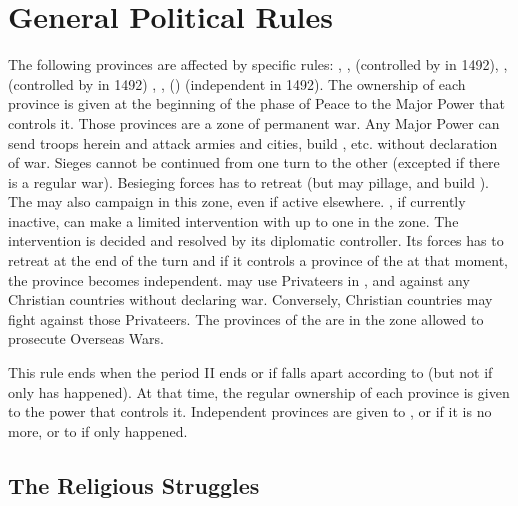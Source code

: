 
\section{General Political Rules}

\label{chSpecific:Balkans}

\aparag The following provinces are affected by specific rules:
, ,  (controlled by \TUR
in 1492), ,  (controlled by \VEN in 1492)
, ,  ()
(independent in 1492).
\aparag The ownership of each province is given at the beginning of the phase
of Peace to the Major Power that controls it.
\aparag Those provinces are a zone of permanent war. Any Major Power can send
troops herein and attack armies and cities, build \Presidios, etc.  without
declaration of war.
\bparag Sieges cannot be continued from one turn to the other (excepted if
there is a regular war). Besieging forces has to retreat (but may pillage, and
build \Presidios).
\bparag The \hab may also campaign in this zone, even if active elsewhere.
\bparag {}, if currently inactive, can make a limited intervention
with up to one \ARMY\faceplus in the zone. The intervention is decided and
resolved by its diplomatic controller. Its forces has to retreat at the end of
the turn and if it controls a province of the  at that moment,
the province becomes independent.
\aparag \TUR may use Privateers in ,  and 
against any Christian countries without declaring war.  Conversely, Christian
countries may fight against those Privateers.
\aparag The provinces of the  are in the zone allowed to
prosecute Overseas Wars.

\bparag This rule ends when the period II ends or if  falls
apart according to  (but not if only
 has happened).
\bparag At that time, the regular ownership of each province is given to the
power that controls it. Independent provinces are given to , or
 if it is no more, or to \HAB if only  happened.



\subsection{The Religious Struggles}

